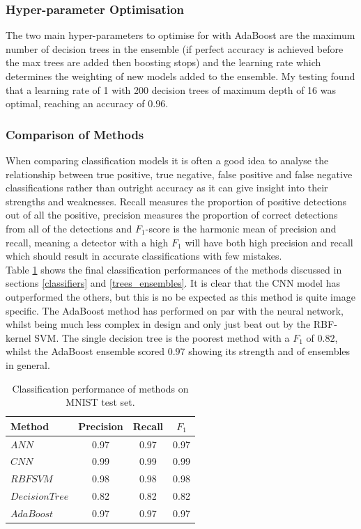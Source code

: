 \documentclass[11pt]{article}
\begin{document}
\subsubsection{Hyper-parameter Optimisation}

The two main hyper-parameters to optimise for with AdaBoost are the maximum number of decision trees in the ensemble (if perfect accuracy is achieved before the max trees are added then boosting stops) and the learning rate which determines the weighting of new models added to the ensemble. My testing found that a learning rate of 1 with 200 decision trees of maximum depth of 16 was optimal, reaching an accuracy of $0.96$.

\subsubsection{Comparison of Methods}

When comparing classification models it is often a good idea to analyse the relationship between true positive, true negative, false positive and false negative classifications rather than outright accuracy as it can give insight into their strengths and weaknesses. Recall measures the proportion of positive detections out of all the positive, precision measures the proportion of correct detections from all of the detections and $F_1$-score is the harmonic mean of precision and recall, meaning a detector with a high $F_1$ will have both high precision and recall which should result in accurate classifications with few mistakes. \\

Table \ref{04_classification_report} shows the final classification performances of the methods discussed in sections \ref{classifiers} and \ref{trees_ensembles}. It is clear that the CNN model has outperformed the others, but this is no be expected as this method is quite image specific. The AdaBoost method has performed on par with the neural network, whilst being much less complex in design and only just beat out by the RBF-kernel SVM. The single decision tree is the poorest method with a $F_1$ of $0.82$, whilst the AdaBoost ensemble scored $0.97$ showing its strength and of ensembles in general.

\begin{table}[h]
\begin{tabular}{|l||c|c|c|} 
     \hline
     Method & Precision & Recall & $F_1$ \\ [0.5ex] 
     \hline
     $ANN$           & 0.97 & 0.97 & 0.97 \\ 
     $CNN$           & 0.99 & 0.99 & 0.99 \\ 
     $RBFSVM$        & 0.98 & 0.98 & 0.98 \\ 
     $Decision Tree$ & 0.82 & 0.82 & 0.82 \\ 
     $AdaBoost$      & 0.97 & 0.97 & 0.97 \\ [1ex] 
     \hline
\end{tabular}
\caption{Classification performance of methods on MNIST test set.}
\label{04_classification_report}
\end{table}
\end{document}
